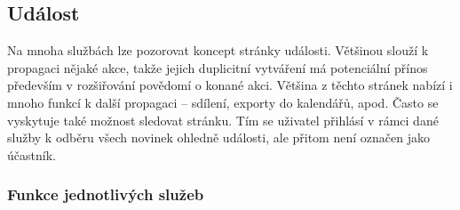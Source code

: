 \documentclass[12pt,oneside,final]{fithesis2}
\begin{document}
\subsection{Událost}\label{eventPage}
Na mnoha službách lze pozorovat koncept stránky události. Většinou slouží k propagaci nějaké akce, takže jejich duplicitní vytváření má potenciální přínos především v rozšiřování povědomí o konané akci. Většina z těchto stránek nabízí i mnoho funkcí k další propagaci -- sdílení, exporty do kalendářů, apod. Často se vyskytuje také možnost sledovat stránku. Tím se uživatel přihlásí v rámci dané služby k odběru všech novinek ohledně události, ale přitom není označen jako účastník.

\subsubsection*{Funkce jednotlivých služeb}
\end{document}
